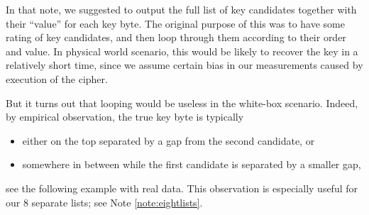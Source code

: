 	In that note, we suggested to output the full list of key candidates together with their ``value'' for each key byte. The original purpose of this was to have some rating of key candidates, and then loop through them according to their order and value. In physical world scenario, this would be likely to recover the key in a relatively short time, since we assume certain bias in our measurements caused by execution of the cipher.
	
	But it turns out that looping would be useless in the white-box scenario. Indeed, by empirical observation, the true key byte is typically
	\begin{itemize}
		\item either on the top separated by a gap from the second candidate, or
		\item somewhere in between while the first candidate is separated by a smaller gap,
	\end{itemize}
	see the following example with real data. This observation is especially useful for our $8$ separate lists; see Note \ref{note:eightlists}.
	
